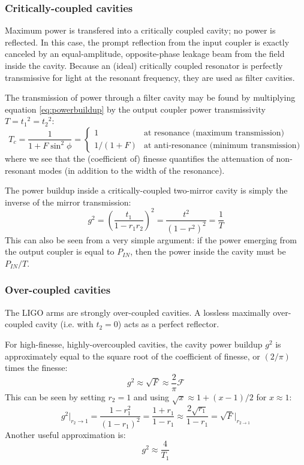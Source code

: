 \subsubsection{Critically-coupled cavities}

Maximum power is transfered into a critically coupled cavity; no power
is reflected. In this case, the prompt reflection from the input coupler
is exactly canceled by an equal-amplitude, opposite-phase leakage
beam from the field inside the cavity. Because an (ideal) critically
coupled resonator is perfectly transmissive for light at the resonant
frequency, they are used as filter cavities.

The transmission of power through a filter cavity may be found by
multiplying equation \ref{eq:powerbuildup} by the output coupler
power transmissivity $T={t_{1}}^{2}={t_{2}}^{2}$: 
\begin{equation}
T_{c}=\frac{1}{1+F\sin^{2}\phi}=\begin{cases}
1 & \text{at resonance (maximum transmission)}\\
1/(1+F) & \text{at anti-resonance (minimum transmission)}
\end{cases}
\end{equation}
where we see that the (coefficient of) finesse quantifies the attenuation
of non-resonant modes (in addition to the width of the resonance).

The power buildup inside a critically-coupled two-mirror cavity is
simply the inverse of the mirror transmission:
\[
g^{2}=\left(\frac{t_{1}}{1-r_{1}r_{2}}\right)^{2}=\frac{t^{2}}{\left(1-r^{2}\right)^{2}}=\frac{1}{T}
\]
This can also be seen from a very simple argument: if the power emerging
from the output coupler is equal to $P_{IN}$, then the power inside
the cavity must be $P_{IN}/T$.


\subsubsection{Over-coupled cavities}

The LIGO arms are strongly over-coupled cavities. A lossless maximally over-coupled
cavity (i.e. with $t_{2}=0$) acts as a perfect reflector. 

For high-finesse, highly-overcoupled cavities, the cavity power buildup
$g^{2}$ is approximately equal to the square root of the coefficient
of finesse, or $(2/\pi)$ times the finesse:
\begin{equation}
g^{2}\approx\sqrt{F}\approx\frac{2}{\pi}\mathcal{F}
\end{equation}
This can be seen by setting $r_{2}=1$ and using $\sqrt{x}\approx1+(x-1)/2$
for $x\approx1$:
\begin{equation}
g^{2}\bigg|_{r_{2}\to1}=\frac{1-r_{1}^{2}}{\left(1-r_{1}\right)^{2}}=\frac{1+r_{1}}{1-r_{1}}\approx\frac{2\sqrt{r_{1}}}{1-r_{1}}=\sqrt{F}\bigg|_{r_{2\to1}}
\end{equation}
%
%
Another useful approximation is:
\[
g^{2}\approx\frac{4}{T_{1}}
\]
